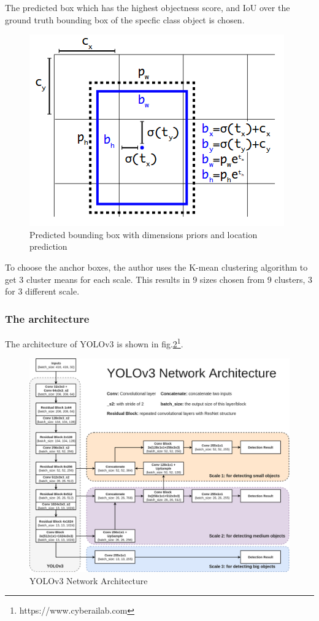 The predicted box which has the highest objectness score, and \acrshort{IoU} over the ground truth bounding box of the specfic class object is chosen.
\begin{figure}[h!]
    \centering
    \includegraphics[scale=0.5]{Chapters/Fig/yolo_bounding_box.png}
    \caption{Predicted bounding box with dimensions priors and location prediction}
    \label{fig:bounding_box}
\end{figure}
\par
To choose the anchor boxes, the author uses the K-mean clustering algorithm to get 3 cluster means for each scale\cite{yolov3}. This results in 9 sizes chosen from 9 clusters, 3 for 3 different scale.
\subsubsection{The architecture}
\hspace{0.45cm}The architecture of YOLOv3 \cite{yolov3} is shown in fig.\ref{fig:yolo_arc}\footnote{https://www.cyberailab.com}.\par 
\begin{figure}[h!]
    \centering
    \includegraphics[scale=0.3]{Chapters/Fig/YOLOv3_architecture.png}
    \caption{YOLOv3 Network Architecture}
    \label{fig:yolo_arc}
\end{figure}

